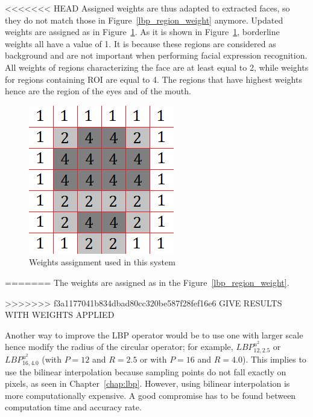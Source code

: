 <<<<<<< HEAD
\noindent Assigned weights are thus adapted to extracted faces, so they do not match those in Figure~\ref{lbp_region_weight} anymore. Updated weights are assigned as in Figure~\ref{implementation_lbp_weight}. As it is shown in Figure~\ref{implementation_lbp_weight}, borderline weights all have a value of 1. It is because these regions are considered as background and are not important when performing facial expression recognition. All weights of regions characterizing the face are at least equal to 2, while weights for regions containing ROI are equal to 4. The regions that have highest weights hence are the region of the eyes and of the mouth.
\newline

\begin{figure}[!h]
\begin{center}
\noindent \includegraphics[scale=0.5]{figures/implementation_lbp_weight} 
\newline
\caption{Weights assignment used in this system}
\label{implementation_lbp_weight}
\end{center} 
\end{figure}

=======
\noindent The weights are assigned as in the Figure~\ref{lbp_region_weight}. 
\newline

>>>>>>> f3a1177041b834dbad80cc320be587f28fef16e6
\noindent GIVE RESULTS WITH WEIGHTS APPLIED
\newline

\noindent Another way to improve the LBP operator would be to use one with larger scale hence modify the radius of the circular operator; for example, $ LBP_{12,2.5}^{u^2} $ or $ LBP_{16,4.0}^{u^2} $ (with $ P = 12 $ and $ R = 2.5 $ or with $ P = 16 $ and $ R = 4.0 $). This implies to use the bilinear interpolation because sampling points do not fall exactly on pixels, as seen in Chapter~\ref{chap:lbp}. However, using bilinear interpolation is more computationally expensive. A good compromise has to be found between computation time and accuracy rate.
\newline

